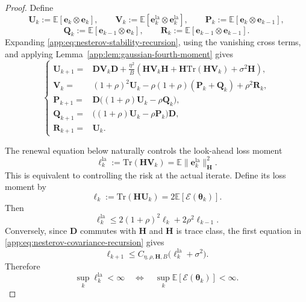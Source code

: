 \documentclass[10pt,a4paper]{amsart}
\newcommand{\EE}{\mathbb{E}}
\newcommand{\Tr}{\mathrm{Tr}}
\newcommand{\bD}{\fbf{D}}
\newcommand{\bH}{\fbf{H}}
\newcommand{\bP}{\fbf{P}}
\newcommand{\bQ}{\fbf{Q}}
\newcommand{\bR}{\fbf{R}}
\newcommand{\bU}{\fbf{U}}
\newcommand{\bV}{\fbf{V}}
\newcommand{\be}{\mathrm{\fbf{e}}}
\newcommand{\btheta}{\bm{\theta}}
\newcommand{\cE}{\mathcal{E}}
\newcommand{\fbf}[1]{\mathbf{#1}}
\newcommand{\la}{\mathrm{la}}
\renewcommand{\leq}{\leqslant}
\begin{document}
\begin{proof}
Define
\[
\bU_k:=\EE[\be_k\otimes\be_k],
\qquad
\bV_k:=\EE[\be_k^{\la}\otimes\be_k^{\la}],
\qquad
\bP_k:=\EE[\be_k\otimes\be_{k-1}],
\]
\[
\bQ_k:=\EE[\be_{k-1}\otimes\be_k],
\qquad
\bR_k:=\EE[\be_{k-1}\otimes\be_{k-1}].
\]
Expanding \eqref{app:eq:nesterov-stability-recursion}, using the vanishing cross terms, and
applying Lemma~\ref{app:lem:gaussian-fourth-moment} gives
\begin{equation}
\label{app:eq:nesterov-covariance-recursion}
\left\{
\begin{aligned}
\bU_{k+1}
={}&
\bD\bV_k\bD
+
\frac{\eta^2}{B}
\left(
\bH\bV_k\bH
+
\bH\Tr(\bH\bV_k)
+
\sigma^2\bH
\right),
\\
\bV_k
={}&
(1+\rho)^2\bU_k
-
\rho(1+\rho)(\bP_k+\bQ_k)
+
\rho^2\bR_k,
\\
\bP_{k+1}
={}&
\bD\bigl((1+\rho)\bU_k-\rho\bQ_k\bigr),
\\
\bQ_{k+1}
={}&
\bigl((1+\rho)\bU_k-\rho\bP_k\bigr)\bD,
\\
\bR_{k+1}
={}&
\bU_k.
\end{aligned}
\right.
\end{equation}

The renewal equation below naturally controls the look-ahead loss moment
\[
\ell_k^{\la}
:=
\Tr(\bH\bV_k)
=
\EE\|\be_k^{\la}\|_{\bH}^2.
\]
This is equivalent to controlling the risk at the actual iterate. Define its loss moment by
\[
\ell_k
:=
\Tr(\bH\bU_k)
=
2\EE[\cE(\btheta_k)].
\]
Then
\begin{equation}
\label{app:eq:nesterov-risk-equivalence-forward}
\ell_k^{\la}
\leq
2(1+\rho)^2\ell_k+2\rho^2\ell_{k-1}.
\end{equation}
Conversely, since \(\bD\) commutes with \(\bH\) and \(\bH\) is trace class,
the first equation in \eqref{app:eq:nesterov-covariance-recursion} gives
\begin{equation}
\label{app:eq:nesterov-risk-equivalence-backward}
\ell_{k+1}
\leq
C_{\eta,\rho,\bH,B}
\bigl(\ell_k^{\la}+\sigma^2\bigr).
\end{equation}
Therefore
\[
\sup_k\ell_k^{\la}<\infty
\quad\Longleftrightarrow\quad
\sup_k\EE[\cE(\btheta_k)]<\infty.
\]


\end{proof}
\end{document}
